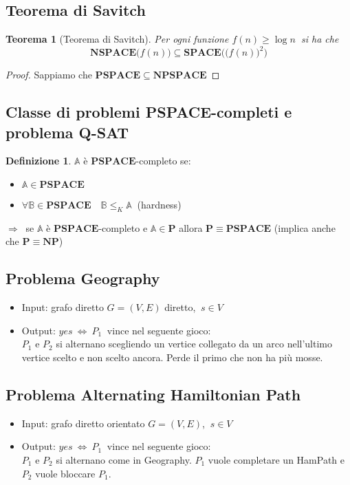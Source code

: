\documentclass[a4paper]{article}
\newtheorem{thm}{Teorema}[subsection]
\theoremstyle{definition}
\newtheorem{definit}{Definizione}[subsection]
\newcommand{\p}{\mathbf{P}}
\newcommand{\np}{\mathbf{NP}}
\newcommand{\Space}{\mathbf{SPACE}}
\newcommand{\pspace}{\mathbf{PSPACE}}
\newcommand{\nspace}{\mathbf{NSPACE}}
\newcommand{\npspace}{\mathbf{NPSPACE}}
\newcommand{\prob}[1]{\mathbb{#1}}
\begin{document}
		\subsection{Teorema di Savitch}
			\begin{thm}[Teorema di Savitch]
				Per ogni funzione $ f(n) \geq \log n \ $ si ha che
				\[
					\nspace\big(f(n)\big) \subseteq \Space\Big(\big(f(n)\big)^2\Big)
				\]
			\end{thm}
			
			\begin{proof}
				Sappiamo che $ \pspace \subseteq \npspace $
			\end{proof}
		
		\subsection{Classe di problemi PSPACE-completi e problema Q-SAT}
			\begin{definit}
				$ \prob{A} $ è $ \pspace$-completo se:
				\begin{itemize}
					\item $ \prob{A} \in \pspace $
					\item $ \forall \prob{B} \in \pspace \quad \prob{B} \leq_K \prob{A} \ $ (hardness)
				\end{itemize}
				$ \Rightarrow\ $ se $ \prob{A} $ è $ \pspace$-completo e $ \prob{A}\in \p $ allora $ \p \equiv\pspace $ (implica anche che $ \p \equiv\np $) 
			\end{definit}
		
		\subsection{Problema Geography}
			\begin{itemize}
				\item Input: grafo diretto $ G = (V, E) $ diretto, $ \ s \in V $
				\item Output: $ yes \ \Leftrightarrow\ P_1 \ $ vince nel seguente gioco:\\
				$ P_1 $ e $ P_2 $ si alternano scegliendo un vertice collegato da un arco nell'ultimo vertice scelto e non scelto ancora. Perde il primo che non ha più mosse.
			\end{itemize}
		
		\subsection{Problema Alternating Hamiltonian Path}
			\begin{itemize}
				\item Input: grafo diretto orientato $ G = (V, E) $, $ \ s\in V $
				\item Output: $ yes\ \Leftrightarrow\ P_1 \ $ vince nel seguente gioco:\\
				$ P_1 $ e $ P_2 $ si alternano come in Geography. $ P_1 $ vuole completare un HamPath e $ P_2 $ vuole bloccare $ P_1 $.
			\end{itemize}
		
\end{document}
